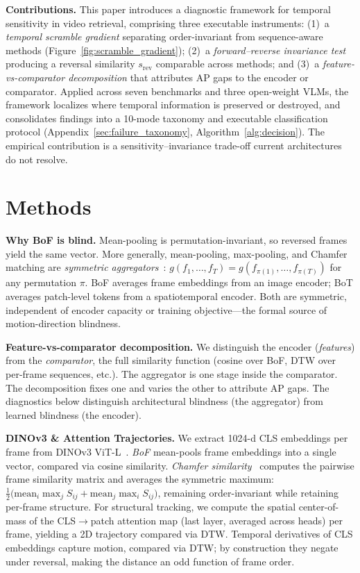 \documentclass{article}
\theoremstyle{remark}
\begin{document}
\textbf{Contributions.} This paper introduces a diagnostic framework for temporal sensitivity in video retrieval, comprising three executable instruments: (1)~a \emph{temporal scramble gradient} separating order-invariant from sequence-aware methods (Figure~\ref{fig:scramble_gradient}); (2)~a \emph{forward--reverse invariance test} producing a reversal similarity $s_\text{rev}$ comparable across methods; and (3)~a \emph{feature-vs-comparator decomposition} that attributes AP gaps to the encoder or comparator. Applied across seven benchmarks and three open-weight VLMs, the framework localizes where temporal information is preserved or destroyed, and consolidates findings into a 10-mode taxonomy and executable classification protocol (Appendix~\ref{sec:failure_taxonomy}, Algorithm~\ref{alg:decision}). The empirical contribution is a sensitivity--invariance trade-off current architectures do not resolve.

\section{Methods}
\label{sec:methods}

\textbf{Why BoF is blind.}
Mean-pooling is permutation-invariant, so reversed frames yield the same vector. More generally, mean-pooling, max-pooling, and Chamfer matching are \emph{symmetric aggregators}~\cite{deepsets}: $g(f_1, \ldots, f_T) = g(f_{\pi(1)}, \ldots, f_{\pi(T)})$ for any permutation $\pi$. BoF averages frame embeddings from an image encoder; BoT averages patch-level tokens from a spatiotemporal encoder. Both are symmetric, independent of encoder capacity or training objective---the formal source of motion-direction blindness.

\textbf{Feature-vs-comparator decomposition.}
We distinguish the encoder (\emph{features}) from the \emph{comparator}, the full similarity function (cosine over BoF, DTW over per-frame sequences, etc.). The aggregator is one stage inside the comparator. The decomposition fixes one and varies the other to attribute AP gaps. The diagnostics below distinguish architectural blindness (the aggregator) from learned blindness (the encoder).

\textbf{DINOv3 \& Attention Trajectories.} We extract 1024-d CLS embeddings per frame from DINOv3 ViT-L~\cite{dinov3}. \emph{BoF} mean-pools frame embeddings into a single vector, compared via cosine similarity. \emph{Chamfer similarity}~\cite{kordopatis2019visil} computes the pairwise frame similarity matrix and averages the symmetric maximum: $\frac{1}{2}\bigl(\mathrm{mean}_i \max_j S_{ij} + \mathrm{mean}_j \max_i S_{ij}\bigr)$, remaining order-invariant while retaining per-frame structure. For structural tracking, we compute the spatial center-of-mass of the CLS$\to$patch attention map (last layer, averaged across heads) per frame, yielding a 2D trajectory compared via DTW. Temporal derivatives of CLS embeddings capture motion, compared via DTW; by construction they negate under reversal, making the distance an odd function of frame order.
\end{document}
